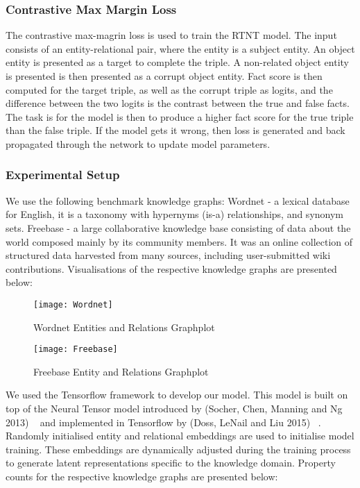 \subsubsection{Contrastive Max Margin Loss}
The contrastive max-magrin loss \cite{reference} is used to train the RTNT model. The input consists of an entity-relational pair, where the entity is a subject entity. An object entity is presented as a target to complete the triple. A non-related object entity is presented is then presented as a corrupt object entity. Fact score is then computed for the target triple, as well as the corrupt triple as logits, and the difference between the two logits is the contrast between the true and false facts. The task is for the model is then to produce a higher fact score for the true triple than the false triple. If the model gets it wrong, then loss is generated and back propagated through the network to update model parameters. \newline

\subsubsection{Experimental Setup} 

We use the following benchmark knowledge graphs: Wordnet - a lexical database for English, it is a taxonomy with hypernyms (is-a) relationships, and synonym sets. \newline
Freebase - a large collaborative knowledge base consisting of data about the world composed mainly by its community members. It was an online collection of structured data harvested from many sources, including user-submitted wiki contributions. \newline
Visualisations of the respective knowledge graphs are presented below:

\begin{figure}[H]
  	\caption{Wordnet Entities and Relations Graphplot}
   	\centering
    	\texttt{[image: Wordnet]}
\end{figure}

\begin{figure}[H]
  	\caption{Freebase Entity and Relations Graphplot}
   	\centering
    	\texttt{[image: Freebase]}
\end{figure}


We used the Tensorflow framework to develop our model.  This model is built on top of the Neural Tensor model introduced by (Socher, Chen, Manning and Ng 2013) ~\citep{NIPS2013_5028} and implemented in Tensorflow by (Doss, LeNail and Liu 2015)  ~\citep{Doss2015}. Randomly initialised entity and relational embeddings are used to initialise model training. These embeddings are dynamically adjusted during the training process to generate latent representations specific to the knowledge domain. Property counts for the respective knowledge graphs are presented below:

